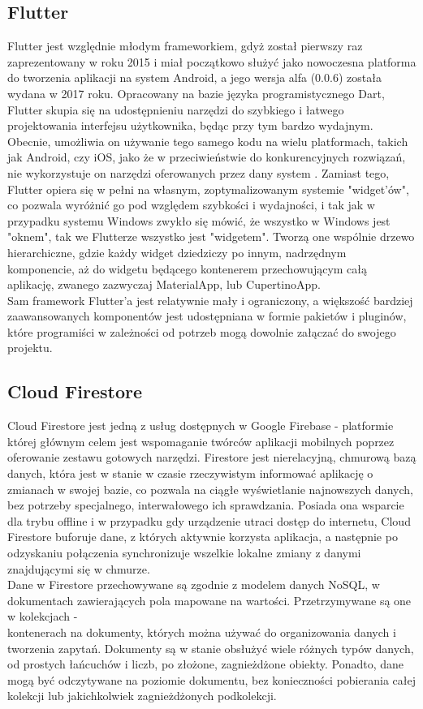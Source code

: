 \documentclass[12pt, a4paper]{article}
\begin{document}
\begin{sloppypar}
{  \subsection{Flutter}
  {
    Flutter jest względnie młodym frameworkiem, gdyż został pierwszy raz zaprezentowany
    w roku 2015 i miał początkowo służyć jako nowoczesna platforma do tworzenia aplikacji
    na system Android, a jego wersja alfa (0.0.6) została wydana w 2017 roku.
    Opracowany na bazie języka programistycznego Dart, Flutter skupia się
    na udostępnieniu narzędzi do szybkiego i łatwego projektowania interfejsu użytkownika,
    będąc przy tym bardzo wydajnym. Obecnie, umożliwia on używanie tego samego kodu na
    wielu platformach, takich jak Android, czy iOS, jako że w przeciwieństwie do
    konkurencyjnych rozwiązań, nie wykorzystuje on narzędzi oferowanych przez dany system
    \cite{flutter}. Zamiast tego, Flutter opiera się w pełni na własnym, zoptymalizowanym
    systemie "widget'ów", co pozwala wyróżnić go pod względem szybkości i wydajności,
    i tak jak w przypadku systemu Windows zwykło się mówić, że wszystko w Windows jest
    "oknem", tak we Flutterze wszystko jest "widgetem". Tworzą one wspólnie drzewo hierarchiczne,
    gdzie każdy widget dziedziczy po innym, nadrzędnym komponencie, aż do widgetu będącego
    kontenerem przechowującym całą aplikację, zwanego zazwyczaj MaterialApp, lub
    CupertinoApp.\\
    Sam framework Flutter'a jest relatywnie mały i ograniczony, a większość bardziej
    zaawansowanych komponentów jest udostępniana w formie pakietów i pluginów, które
    programiści w zależności od potrzeb mogą dowolnie załączać do swojego projektu.
  }
  \subsection{Cloud Firestore}
  {
    Cloud Firestore jest jedną z usług dostępnych w Google Firebase - platformie której
    głównym celem jest wspomaganie twórców aplikacji mobilnych poprzez oferowanie
    zestawu gotowych narzędzi. Firestore jest nierelacyjną, chmurową bazą danych, która
    jest w stanie w czasie rzeczywistym informować aplikację o zmianach w swojej bazie,
    co pozwala na ciągłe wyświetlanie najnowszych danych, bez potrzeby specjalnego,
    interwałowego ich sprawdzania. Posiada ona wsparcie dla trybu offline i w przypadku
    gdy urządzenie utraci dostęp do internetu, Cloud Firestore buforuje dane, z których
    aktywnie korzysta aplikacja, a następnie po odzyskaniu połączenia synchronizuje
    wszelkie lokalne zmiany z danymi znajdującymi się w chmurze.\\
    Dane w Firestore przechowywane są zgodnie z modelem danych NoSQL, w dokumentach
    zawierających pola mapowane na wartości. Przetrzymywane są one w kolekcjach - \\
    kontenerach na dokumenty, których można używać do organizowania danych i tworzenia
    zapytań. Dokumenty są w stanie obsłużyć wiele różnych typów danych, od prostych
    łańcuchów i liczb, po złożone, zagnieżdżone obiekty. Ponadto, dane mogą być odczytywane
    na poziomie dokumentu, bez konieczności pobierania całej kolekcji lub jakichkolwiek
    zagnieżdżonych podkolekcji.
  }
}
\end{sloppypar}
\end{document}
